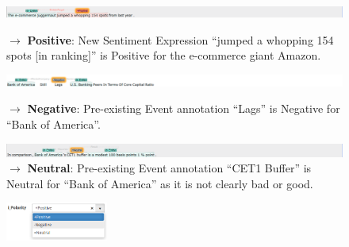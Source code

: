 \begin{figure}[h]
\captionsetup[subfigure]{labelformat=empty}
\begin{subfloat}
    \centering
    \includegraphics[width=\textwidth]{img/amzn00-s04 pos example.png}
    \caption*{$\rightarrow$ \textbf{Positive}: New Sentiment Expression ``jumped a whopping 154 spots [in ranking]'' is Positive for the e-commerce giant Amazon.}
\end{subfloat}

\begin{subfloat}
    \centering
    \includegraphics[width=\textwidth]{img/bac02s01 negative example.png}
    \caption*{$\rightarrow$ \textbf{Negative}: Pre-existing Event annotation ``Lags'' is Negative for ``Bank of America''.}
\end{subfloat}

\begin{subfloat}
    \centering
    \includegraphics[width=\textwidth]{img/bac02s04 neutral example.png}
    \caption*{$\rightarrow$ \textbf{Neutral}: Pre-existing Event annotation ``CET1 Buffer'' is Neutral for ``Bank of America'' as it is not clearly bad or good.}
\end{subfloat}

\end{figure}

\begin{figure}
    \centering
    \includegraphics[width=0.3\textwidth]{img/polarityui.png}
    \vspace{-10pt}
    \label{fig:polarityui}
\end{figure}

